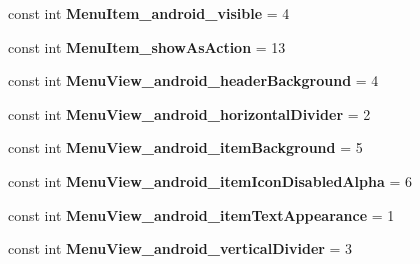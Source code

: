 \begin{DoxyCompactItemize}
\item 
\hypertarget{classClient_1_1Droid_1_1Resource_1_1Styleable_adc427b62c372d2736e354ed3362f0f42}{}const int {\bfseries Menu\+Item\+\_\+android\+\_\+visible} = 4\label{classClient_1_1Droid_1_1Resource_1_1Styleable_adc427b62c372d2736e354ed3362f0f42}

\item 
\hypertarget{classClient_1_1Droid_1_1Resource_1_1Styleable_a9619179dd60a66b4841a1d495658a104}{}const int {\bfseries Menu\+Item\+\_\+show\+As\+Action} = 13\label{classClient_1_1Droid_1_1Resource_1_1Styleable_a9619179dd60a66b4841a1d495658a104}

\item 
\hypertarget{classClient_1_1Droid_1_1Resource_1_1Styleable_a379ea75370df28575bf6d22a1eda4111}{}const int {\bfseries Menu\+View\+\_\+android\+\_\+header\+Background} = 4\label{classClient_1_1Droid_1_1Resource_1_1Styleable_a379ea75370df28575bf6d22a1eda4111}

\item 
\hypertarget{classClient_1_1Droid_1_1Resource_1_1Styleable_a75cb4720fdfadcd5999ca5df527bde87}{}const int {\bfseries Menu\+View\+\_\+android\+\_\+horizontal\+Divider} = 2\label{classClient_1_1Droid_1_1Resource_1_1Styleable_a75cb4720fdfadcd5999ca5df527bde87}

\item 
\hypertarget{classClient_1_1Droid_1_1Resource_1_1Styleable_a0b5fce575538d08f84d751e456765dd0}{}const int {\bfseries Menu\+View\+\_\+android\+\_\+item\+Background} = 5\label{classClient_1_1Droid_1_1Resource_1_1Styleable_a0b5fce575538d08f84d751e456765dd0}

\item 
\hypertarget{classClient_1_1Droid_1_1Resource_1_1Styleable_ada6991fd31121710d05ddd8c765831b3}{}const int {\bfseries Menu\+View\+\_\+android\+\_\+item\+Icon\+Disabled\+Alpha} = 6\label{classClient_1_1Droid_1_1Resource_1_1Styleable_ada6991fd31121710d05ddd8c765831b3}

\item 
\hypertarget{classClient_1_1Droid_1_1Resource_1_1Styleable_ad9914b9715f4bcac522df7111af68cb6}{}const int {\bfseries Menu\+View\+\_\+android\+\_\+item\+Text\+Appearance} = 1\label{classClient_1_1Droid_1_1Resource_1_1Styleable_ad9914b9715f4bcac522df7111af68cb6}

\item 
\hypertarget{classClient_1_1Droid_1_1Resource_1_1Styleable_acc524890272945408b6af3464c31ba5a}{}const int {\bfseries Menu\+View\+\_\+android\+\_\+vertical\+Divider} = 3\label{classClient_1_1Droid_1_1Resource_1_1Styleable_acc524890272945408b6af3464c31ba5a}


\end{DoxyCompactItemize}

